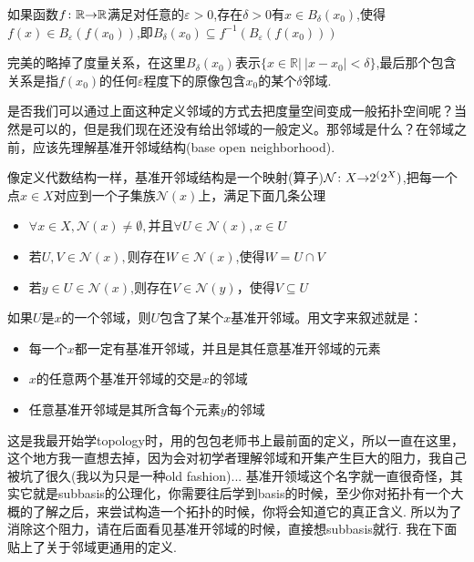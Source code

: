 \begin{proposition}
如果函数${f}\colon{\mathbb{R}}{\to}{\mathbb{R}}$满足对任意的$\varepsilon > 0$,存在$\delta > 0$有$x \in B_{\delta}(x_0)$,使得$f(x) \in B_{\varepsilon}(f(x_0))$,即$B_{\delta}(x_0) \subseteq f^{-1}(B_{\varepsilon}(f(x_0)))$
\end{proposition}

完美的略掉了度量关系，在这里$B_{\delta}(x_0)$表示$\{x \in \mathbb{R} |\ |x-x_0| < \delta \}$,最后那个包含关系是指$f(x_0)$的任何$\varepsilon$程度下的原像包含$x_0$的某个$\delta$邻域.

是否我们可以通过上面这种定义邻域的方式去把度量空间变成一般拓扑空间呢？当然是可以的，但是我们现在还没有给出邻域的一般定义。那邻域是什么？在邻域之前，应该先理解基准开邻域结构(base open neighborhood).

\begin{definition}[subbasis]
像定义代数结构一样，基准开邻域结构是一个映射(算子)${\mathcal{N}}\colon{X}{\to}{2^(2^X)}$,把每一个点$x \in X$对应到一个子集族$\mathcal{N}(x)$上，满足下面几条公理
		\begin{itemize}
			\item $\forall x \in X,\mathcal{N}(x) \neq \emptyset,$并且$\forall U \in \mathcal{N}(x),x \in U$
			\item 若$U,V \in \mathcal{N}(x),$则存在$W \in \mathcal{N}(x)$,使得$W = U \cap V$
			\item 若$y \in U \in \mathcal{N}(x)$,则存在$V \in \mathcal{N}(y)$，使得$V \subseteq U$
		\end{itemize}
如果$U$是$x$的一个邻域，则$U$包含了某个$x$基准开邻域。用文字来叙述就是：
\begin{itemize}
	\item 每一个$x$都一定有基准开邻域，并且是其任意基准开邻域的元素
	\item $x$的任意两个基准开邻域的交是$x$的邻域
	\item 任意基准开邻域是其所含每个元素$y$的邻域
\end{itemize}
\end{definition}

这是我最开始学topology时，用的包包老师书上最前面的定义，所以一直在这里，这个地方我一直想去掉，因为会对初学者理解邻域和开集产生巨大的阻力，我自己被坑了很久(我以为只是一种old fashion)... 基准开领域这个名字就一直很奇怪，其实它就是subbasis的公理化，你需要往后学到basis的时候，至少你对拓扑有一个大概的了解之后，来尝试构造一个拓扑的时候，你将会知道它的真正含义. 所以为了消除这个阻力，请在后面看见基准开邻域的时候，直接想subbasis就行. 我在下面贴上了关于邻域更通用的定义.

